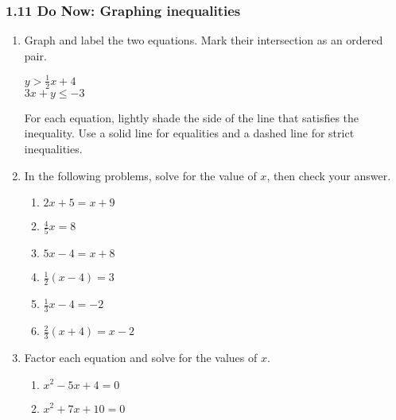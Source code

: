 \documentclass[12pt, twoside]{article}
\begin{document}
\subsubsection*{1.11 Do Now: Graphing inequalities}
\begin{enumerate}
  \item Graph and label the two equations. Mark their intersection as an ordered pair.

  \begin{multicols}{2}
    $y > \frac{1}{2}x+4$ \\
    $3x+y \leq -3$
    \end{multicols} \vspace{1cm}

  \begin{center} %
  \end{center}

For each equation, lightly shade the side of the line that satisfies the inequality. Use a solid line for equalities and a dashed line for strict inequalities.

\newpage
\item In the following problems, solve for the value of $x$, then check your answer.
\begin{multicols}{2}
  \begin{enumerate}[itemsep=4cm]
    \item $2x + 5 = x + 9$
    \item $\frac{4}{5}x = 8$
    \item $5x - 4 = x + 8$
    \item $\frac{1}{2}(x - 4) = 3$
    \item $\frac{1}{3} x - 4 = -2$
    \item $\frac{2}{3}(x + 4) = x - 2$
  \end{enumerate}
  \end{multicols} \vspace{4cm}

\item Factor each equation and solve for the values of $x$.
  \begin{multicols}{2}
    \begin{enumerate}[itemsep=5cm]
    \item $x^2-5x+4=0$
    \item $x^2+7x+10=0$
  \end{enumerate}
  \end{multicols}


\end{enumerate}
\end{document}
